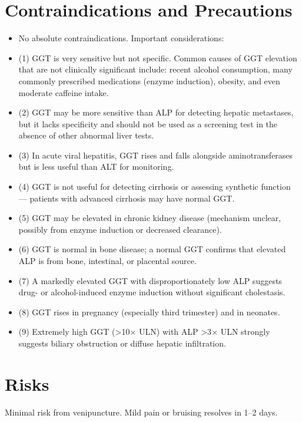 \section*{Contraindications and Precautions}
\begin{itemize}
  \item No absolute contraindications. Important considerations:
  \item (1) GGT is very sensitive but not specific. Common causes of GGT elevation that are not clinically significant include: recent alcohol consumption, many commonly prescribed medications (enzyme induction), obesity, and even moderate caffeine intake.
  \item (2) GGT may be more sensitive than ALP for detecting hepatic metastases, but it lacks specificity and should not be used as a screening test in the absence of other abnormal liver tests.
  \item (3) In acute viral hepatitis, GGT rises and falls alongside aminotransferases but is less useful than ALT for monitoring.
  \item (4) GGT is not useful for detecting cirrhosis or assessing synthetic function --- patients with advanced cirrhosis may have normal GGT.
  \item (5) GGT may be elevated in chronic kidney disease (mechanism unclear, possibly from enzyme induction or decreased clearance).
  \item (6) GGT is normal in bone disease; a normal GGT confirms that elevated ALP is from bone, intestinal, or placental source.
  \item (7) A markedly elevated GGT with disproportionately low ALP suggests drug- or alcohol-induced enzyme induction without significant cholestasis.
  \item (8) GGT rises in pregnancy (especially third trimester) and in neonates.
  \item (9) Extremely high GGT (>10$\times$ ULN) with ALP >3$\times$ ULN strongly suggests biliary obstruction or diffuse hepatic infiltration.
\end{itemize}
\section*{Risks}
Minimal risk from venipuncture. Mild pain or bruising resolves in 1--2 days.

